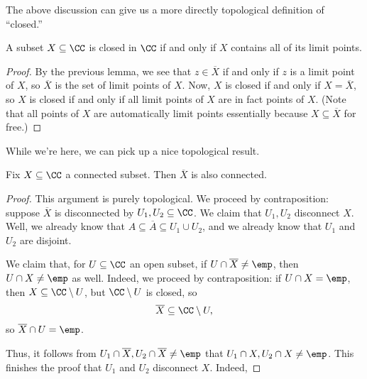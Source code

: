 \documentclass[../notes.tex]{subfiles}
\begin{document}
The above discussion can give us a more directly topological definition of ``closed.''
\begin{lemma}
	A subset $X\subseteq\CC$ is closed in $\CC$ if and only if $X$ contains all of its limit points.
\end{lemma}
\begin{proof}
	By the previous lemma, we see that $z\in\overline X$ if and only if $z$ is a limit point of $X$, so $\overline X$ is the set of limit points of $X$. Now, $X$ is closed if and only if $X=\overline X$, so $X$ is closed if and only if all limit points of $X$ are in fact points of $X$. (Note that all points of $X$ are automatically limit points essentially because $X\subseteq\overline X$ for free.)
\end{proof}

While we're here, we can pick up a nice topological result.
\begin{lemma}
	Fix $X\subseteq\CC$ a connected subset. Then $\overline X$ is also connected.
\end{lemma}
\begin{proof}
	This argument is purely topological. We proceed by contraposition: suppose $\overline X$ is disconnected by $U_1,U_2\subseteq\CC$. We claim that $U_1,U_2$ disconnect $X$. Well, we already know that $A\subseteq\overline A\subseteq U_1\cup U_2$, and we already know that $U_1$ and $U_2$ are disjoint.

	We claim that, for $U\subseteq\CC$ an open subset, if $U\cap\overline X\ne\emp$, then $U\cap X\ne\emp$ as well. Indeed, we proceed by contraposition: if $U\cap X=\emp$, then $X\subseteq\CC\setminus U$, but $\CC\setminus U$ is closed, so
	\[\overline X\subseteq\CC\setminus U,\]
	so $\overline X\cap U=\emp$.

	Thus, it follows from $U_1\cap\overline X,U_2\cap\overline X\ne\emp$ that $U_1\cap X,U_2\cap X\ne\emp$. This finishes the proof that $U_1$ and $U_2$ disconnect $X$. Indeed, 
\end{proof}
\end{document}
